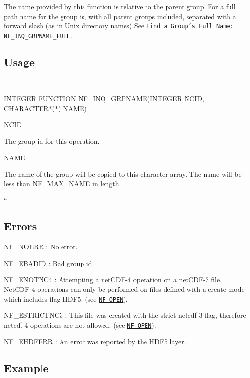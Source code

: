 The name provided by this function is relative to the parent group. For a full path name for the group is, with all parent groups included, separated with a forward slash (as in Unix directory names) See \href{#NF_005fINQ_005fGRPNAME_005fFULL}{\tt Find a Group’s Full Name\+: N\+F\+\_\+\+I\+N\+Q\+\_\+\+G\+R\+P\+N\+A\+M\+E\+\_\+\+F\+U\+LL}.

\subsection*{Usage }

 

I\+N\+T\+E\+G\+ER F\+U\+N\+C\+T\+I\+ON N\+F\+\_\+\+I\+N\+Q\+\_\+\+G\+R\+P\+N\+A\+M\+E(\+I\+N\+T\+E\+G\+E\+R N\+C\+I\+D, C\+H\+A\+R\+A\+C\+T\+E\+R$\ast$($\ast$) N\+A\+M\+E)

{\ttfamily N\+C\+ID}

The group id for this operation.

{\ttfamily N\+A\+ME}

The name of the group will be copied to this character array. The name will be less than N\+F\+\_\+\+M\+A\+X\+\_\+\+N\+A\+ME in length.

``

\subsection*{Errors }

{\ttfamily N\+F\+\_\+\+N\+O\+E\+RR} \+: No error.

{\ttfamily N\+F\+\_\+\+E\+B\+A\+D\+ID} \+: Bad group id.

{\ttfamily N\+F\+\_\+\+E\+N\+O\+T\+N\+C4} \+: Attempting a net\+C\+D\+F-\/4 operation on a net\+C\+D\+F-\/3 file. Net\+C\+D\+F-\/4 operations can only be performed on files defined with a create mode which includes flag H\+D\+F5. (see \href{#NF_005fOPEN}{\tt N\+F\+\_\+\+O\+P\+EN}).

{\ttfamily N\+F\+\_\+\+E\+S\+T\+R\+I\+C\+T\+N\+C3} \+: This file was created with the strict netcdf-\/3 flag, therefore netcdf-\/4 operations are not allowed. (see \href{#NF_005fOPEN}{\tt N\+F\+\_\+\+O\+P\+EN}).

{\ttfamily N\+F\+\_\+\+E\+H\+D\+F\+E\+RR} \+: An error was reported by the H\+D\+F5 layer.

\subsection*{Example }

